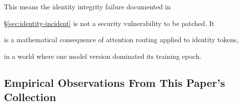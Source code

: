 \documentclass[11pt]{article}
\theoremstyle{definition}
\begin{document}
This means the identity integrity failure documented in





\S\ref{sec:identity-incident} is not a security vulnerability to be patched. It





is a mathematical consequence of attention routing applied to identity tokens,





in a world where one model version dominated its training epoch.











\subsection{Empirical Observations From This Paper's Collection}
\end{document}
